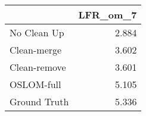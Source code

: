 \begin{tabular}{lr}
\toprule
{} & LFR_om_7 \\
\midrule
No Clean Up  &    2.884 \\
Clean-merge  &    3.602 \\
Clean-remove &    3.601 \\
OSLOM-full   &    5.105 \\
Ground Truth &    5.336 \\
\bottomrule
\end{tabular}
